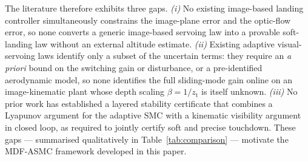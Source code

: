 \documentclass{IEEEtaes}
\begin{document}
The literature therefore exhibits three gaps. \emph{(i)} No existing image-based landing controller simultaneously constrains the image-plane error and the optic-flow error, so none converts a generic image-based servoing law into a provable soft-landing law without an external altitude estimate. \emph{(ii)} Existing adaptive visual-servoing laws identify only a subset of the uncertain terms: they require an \emph{a priori} bound on the switching gain or disturbance, or a pre-identified aerodynamic model, so none identifies the full sliding-mode gain online on an image-kinematic plant whose depth scaling $\beta=1/z_\text{t}$ is itself unknown. \emph{(iii)} No prior work has established a layered stability certificate that combines a Lyapunov argument for the adaptive SMC with a kinematic visibility argument in closed loop, as required to jointly certify soft and precise touchdown. These gaps --- summarised qualitatively in Table~\ref{tab:comparison} --- motivate the MDF-ASMC framework developed in this paper.
\end{document}
